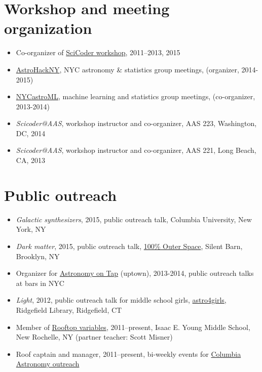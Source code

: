 \documentclass[12pt,letterpaper]{article}
\begin{document}
\section*{Workshop and meeting organization}

\begin{itemize}
	\item Co-organizer of \href{http://scicoder.org}{SciCoder workshop}, 2011--2013, 2015
	\item \href{https://groups.google.com/forum/#!forum/astrohackny}{AstroHackNY}, NYC astronomy \& statistics group meetings, (organizer, 2014-2015)
	\item \href{https://github.com/adrn/nycastroml}{NYCastroML}, machine learning and statistics group meetings, (co-organizer, 2013-2014)
	\item \emph{Scicoder@AAS}, workshop instructor and co-organizer, AAS 223, Washington, DC, 2014
	\item \emph{Scicoder@AAS}, workshop instructor and co-organizer, AAS 221, Long Beach, CA, 2013
\end{itemize}


\section*{Public outreach}

\begin{itemize}
	\item \emph{Galactic synthesizers}, 2015, public outreach talk, Columbia University, New York, NY
	\item \emph{Dark matter}, 2015, public outreach talk, \href{http://silentbarn.org/2015/03/100-outer-space-party}{100\% Outer Space}, Silent Barn, Brooklyn, NY
	\item Organizer for \href{http://astronomyontap.org/}{Astronomy on Tap} (uptown), 2013-2014, public outreach talks at bars in NYC
	\item \emph{Light}, 2012, public outreach talk for middle school girls, \href{http://www.newstimes.com/news/article/Astronomer-Shoot-for-the-stars-3380793.php}{astro4girls}, Ridgefield Library, Ridgefield, CT
	\item Member of \href{http://rv.astro.columbia.edu}{Rooftop variables}, 2011--present, Isaac E. Young Middle School, New Rochelle, NY (partner teacher: Scott Misner)
	\item Roof captain and manager, 2011--present, bi-weekly events for \href{http://outreach.astro.columbia.edu/}{Columbia Astronomy outreach}

\end{itemize}
\end{document}

